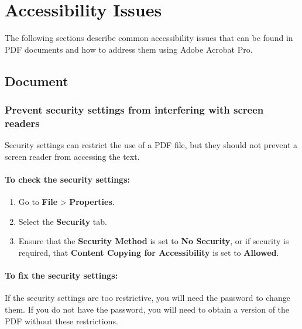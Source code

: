 \section{Accessibility Issues}
\label{sec:accessibility-issues}

The following sections describe common accessibility issues that can be found in PDF documents and how to address them using Adobe Acrobat Pro.

\subsection{Document}
\label{sub:document}

\subsubsection{Prevent security settings from interfering with screen readers}
\label{ssub:prevent-security-settings-from-interfering-with-screen-readers}

Security settings can restrict the use of a PDF file, but they should not prevent a screen reader from accessing the text.

\paragraph{To check the security settings:}
\label{par:to-check-the-security-settings}

\begin{enumerate}
	\itemsep-0.5em
	\item Go to \textbf{File} > \textbf{Properties}.
	\item Select the \textbf{Security} tab.
	\item Ensure that the \textbf{Security Method} is set to \textbf{No Security}, or if security is required, that \textbf{Content Copying for Accessibility} is set to \textbf{Allowed}.
\end{enumerate}

\paragraph{To fix the security settings:}
\label{par:to-fix-the-security-settings}

If the security settings are too restrictive, you will need the password to change them. If you do not have the password, you will need to obtain a version of the PDF without these restrictions.

